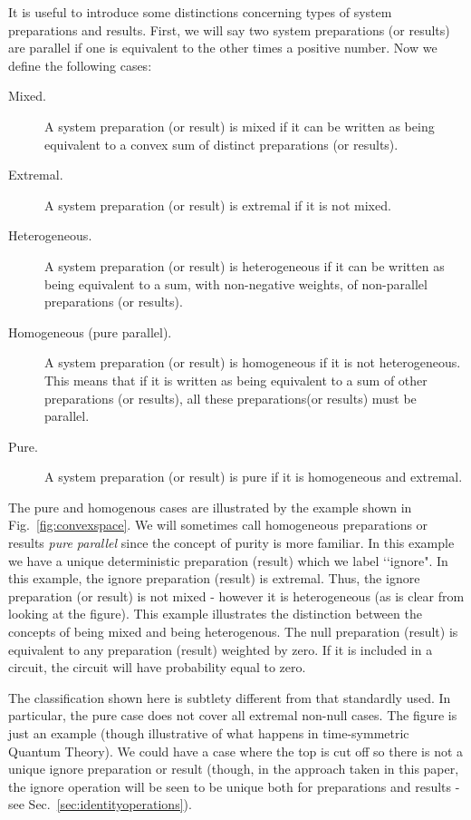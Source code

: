 \documentclass[10pt]{article}
\begin{document}
It is useful to introduce some distinctions concerning types of system preparations and results.  First, we will say two system preparations (or results) are parallel if one is equivalent to the other times a positive number.  Now we define the following cases:
\begin{description}
  \item[Mixed.] A system preparation (or result) is mixed if it can be written as being equivalent to a convex sum of distinct preparations (or results).
  \item[Extremal.] A system preparation (or result) is extremal if it is not mixed.
  \item[Heterogeneous.] A system preparation (or result) is heterogeneous if it can be written as being equivalent to a sum, with non-negative weights, of non-parallel preparations (or results).
  \item[Homogeneous (pure parallel).] A system preparation (or result) is homogeneous if it is not heterogeneous.  This means that if it is written as being equivalent to a sum of other preparations (or results), all these preparations(or results) must be parallel.
  \item[Pure.]  A system preparation (or result) is pure if it is homogeneous and extremal.
\end{description}
The pure and homogenous cases are illustrated by the example shown in Fig.\ \ref{fig:convexspace}.   We will sometimes call homogeneous preparations or results \emph{pure parallel} since the concept of purity is more familiar. In this example we have a unique deterministic preparation (result) which we label \lq\lq ignore".  In this example, the ignore preparation (result) is extremal. Thus, the ignore preparation (or result) is not mixed - however it is heterogeneous (as is clear from looking at the figure).   This example illustrates the distinction between the concepts of being mixed and being heterogenous.  The null preparation (result) is equivalent to any preparation (result) weighted by zero.  If it is included in a circuit, the circuit will have probability equal to zero.

The classification shown here is subtlety different from that standardly used.  In particular, the pure case does not cover all extremal non-null cases.  The figure is just an example (though illustrative of what happens in time-symmetric Quantum Theory).  We could have a case where the top is cut off so there is not a unique ignore preparation or result (though, in the approach taken in this paper, the ignore operation will be seen to be unique both for preparations and results - see Sec.\ \ref{sec:identityoperations}).
\end{document}
